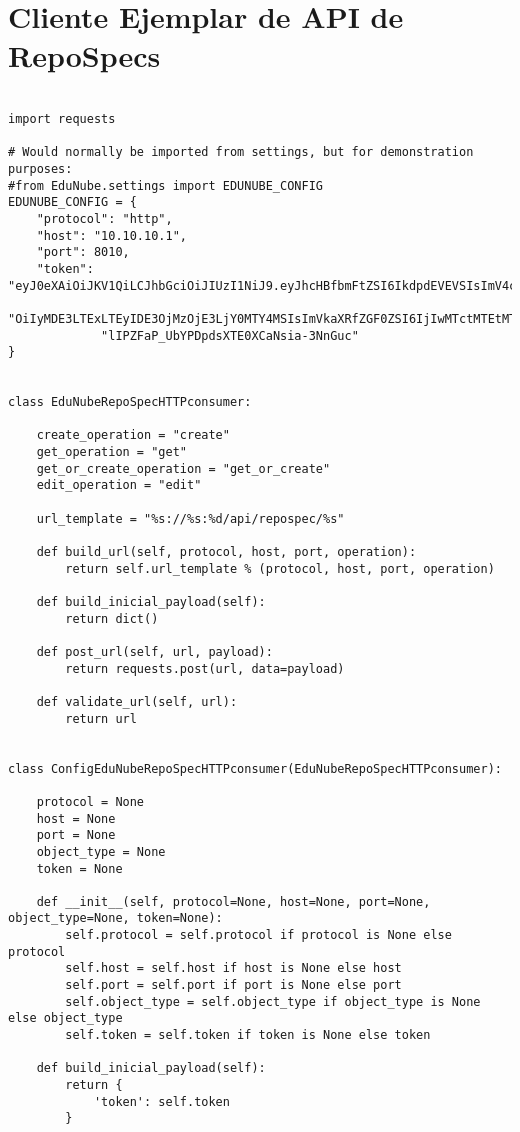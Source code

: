 \section{Cliente Ejemplar de API de RepoSpecs}
\lstset{language=Python}
\begin{lstlisting}[breaklines]

import requests

# Would normally be imported from settings, but for demonstration purposes:
#from EduNube.settings import EDUNUBE_CONFIG
EDUNUBE_CONFIG = {
    "protocol": "http",
    "host": "10.10.10.1",
    "port": 8010,
    "token": "eyJ0eXAiOiJKV1QiLCJhbGciOiJIUzI1NiJ9.eyJhcHBfbmFtZSI6IkdpdEVEVSIsImV4cGlyZXMiOmZhbHNlLCJjcmVhdGVkX2RhdGUi"
             "OiIyMDE3LTExLTEyIDE3OjMzOjE3LjY0MTY4MSIsImVkaXRfZGF0ZSI6IjIwMTctMTEtMTIgMjA6MzY6NDAuMjc5NDAyIn0.825oh2rZU"
             "lIPZFaP_UbYPDpdsXTE0XCaNsia-3NnGuc"
}


class EduNubeRepoSpecHTTPconsumer:

    create_operation = "create"
    get_operation = "get"
    get_or_create_operation = "get_or_create"
    edit_operation = "edit"

    url_template = "%s://%s:%d/api/repospec/%s"

    def build_url(self, protocol, host, port, operation):
        return self.url_template % (protocol, host, port, operation)

    def build_inicial_payload(self):
        return dict()

    def post_url(self, url, payload):
        return requests.post(url, data=payload)

    def validate_url(self, url):
        return url


class ConfigEduNubeRepoSpecHTTPconsumer(EduNubeRepoSpecHTTPconsumer):

    protocol = None
    host = None
    port = None
    object_type = None
    token = None

    def __init__(self, protocol=None, host=None, port=None, object_type=None, token=None):
        self.protocol = self.protocol if protocol is None else protocol
        self.host = self.host if host is None else host
        self.port = self.port if port is None else port
        self.object_type = self.object_type if object_type is None else object_type
        self.token = self.token if token is None else token

    def build_inicial_payload(self):
        return {
            'token': self.token
        }


\end{lstlisting}

